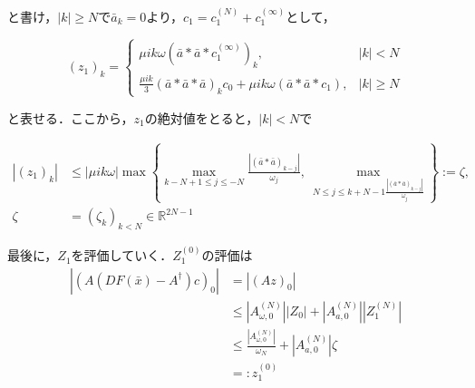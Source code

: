と書け，$|k| \geq N で \bar{a}_k = 0$より，$c_1 = c_1^{(N)} + c_1^{(\infty)}$として，

\begin{equation*}
  (z_1)_k = \begin{cases}
    \mu i k \omega \left( \bar{a} * \bar{a} * c_1^{(\infty)} \right)_k, & |k|<N\\
    \frac{\mu i k}{3} \left( \bar{a} * \bar{a} * \bar{a} \right)_k c_0 + \mu i k \omega \left( \bar{a} * \bar{a} * c_1 \right),   & |k|\geq N
  \end{cases}
\end{equation*}

と表せる．ここから，$z_1$の絶対値をとると，$|k|<N$で

\begin{align*}
  |(z_1)_k| & \leq |\mu ik \omega| \max \left\{ \max_{k-N+1\leq j \leq -N} \frac{|\left( \bar{a} * \bar{a} \right)_{k-j}|}{\omega_j} ,\ \max_{N \leq j \leq k+N-1 \frac{|\left( \bar{a} * \bar{a}\right)_{k-j} |}{\omega_j}} \right\} := \zeta, \\
  \zeta     & = (\zeta_k)_{k < N} \in \mathbb{R}^{2N-1}
\end{align*}

最後に，$Z_1$を評価していく．$Z_1^{(0)}$の評価は
\begin{align*}
  |(A(DF(\bar{x})-A^\dagger)c)_0| & = |(Az)_0|                                                                                                \\
                                  & \leq \left|A_{\omega,0}^{(N)}\right| \left|Z_0\right| + \left|A_{a,0}^{(N)}\right| \left|Z_1^{(N)}\right| \\
                                  & \leq \frac{|A_{\omega, 0}^{(N)}|}{\omega_N} + \left|A_{a,0}^{(N)}\right| \zeta                            \\
                                  & =: z_1^{(0)}
\end{align*}

